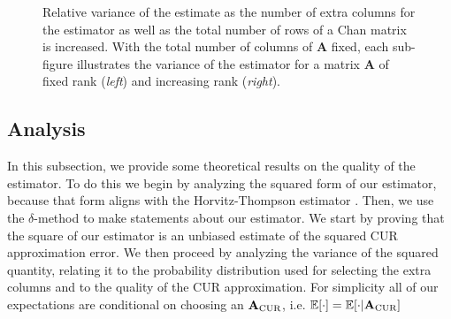\documentclass[11pt]{article}
\newenvironment{subfigure}[2][]{\begin{minipage}{#2}\refstepcounter{subfigure}\def\caption##1{\par\smallskip\centering\textbf{(\alph{subfigure})}~##1\par}}{\end{minipage}}
\newcommand{\curX}{\mathbf{A}_{\textup{CUR}}}
\begin{document}
\begin{figure}
\begin{subfigure}{0.48\textwidth}
        \caption{Increased rank.}
    \end{subfigure}
    \caption{Relative variance of the estimate as the number of extra columns for the estimator as well as the total number of rows of a Chan matrix \cite{Chan1987} is increased.
        With the total number of columns of $\mathbf{A}$ fixed, each sub-figure illustrates the variance of the estimator for a matrix $\mathbf{A}$ of fixed rank (\textit{left}) and increasing rank (\textit{right}).}
    \label{fig:numer_q}
\end{figure}
\subsection{Analysis}
\label{sec:analysis}
In this subsection, we provide some theoretical results on the quality of the estimator. To do this we begin by analyzing the squared form of our estimator, because that form aligns with the Horvitz-Thompson estimator \cite{horvitz1952generalization}. Then, we use the $\delta$-method \cite{oehlert1992note} to make statements about our estimator.
We start by proving that the square of our estimator is an unbiased estimate of the squared CUR approximation error.
We then proceed by analyzing the variance of the squared quantity, relating it to the probability distribution used for selecting the extra columns and to the quality of the CUR approximation. For simplicity all of our expectations are conditional on choosing an $\curX$, i.e. $\mathbb{E}[\cdot] = \mathbb{E}[\cdot | \curX]$
\end{document}
